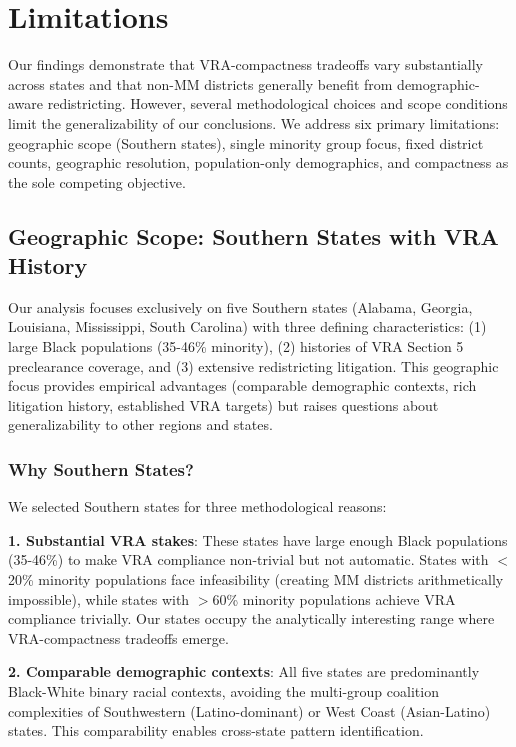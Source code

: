 
\section{Limitations}

Our findings demonstrate that VRA-compactness tradeoffs vary substantially across states and that non-MM districts generally benefit from demographic-aware redistricting. However, several methodological choices and scope conditions limit the generalizability of our conclusions. We address six primary limitations: geographic scope (Southern states), single minority group focus, fixed district counts, geographic resolution, population-only demographics, and compactness as the sole competing objective.

\subsection{Geographic Scope: Southern States with VRA History}

Our analysis focuses exclusively on five Southern states (Alabama, Georgia, Louisiana, Mississippi, South Carolina) with three defining characteristics: (1) large Black populations (35-46\% minority), (2) histories of VRA Section 5 preclearance coverage, and (3) extensive redistricting litigation. This geographic focus provides empirical advantages (comparable demographic contexts, rich litigation history, established VRA targets) but raises questions about generalizability to other regions and states.

\subsubsection{Why Southern States?}

We selected Southern states for three methodological reasons:

\textbf{1. Substantial VRA stakes}: These states have large enough Black populations (35-46\%) to make VRA compliance non-trivial but not automatic. States with $<$20\% minority populations face infeasibility (creating MM districts arithmetically impossible), while states with $>$60\% minority populations achieve VRA compliance trivially. Our states occupy the analytically interesting range where VRA-compactness tradeoffs emerge.

\textbf{2. Comparable demographic contexts}: All five states are predominantly Black-White binary racial contexts, avoiding the multi-group coalition complexities of Southwestern (Latino-dominant) or West Coast (Asian-Latino) states. This comparability enables cross-state pattern identification.


